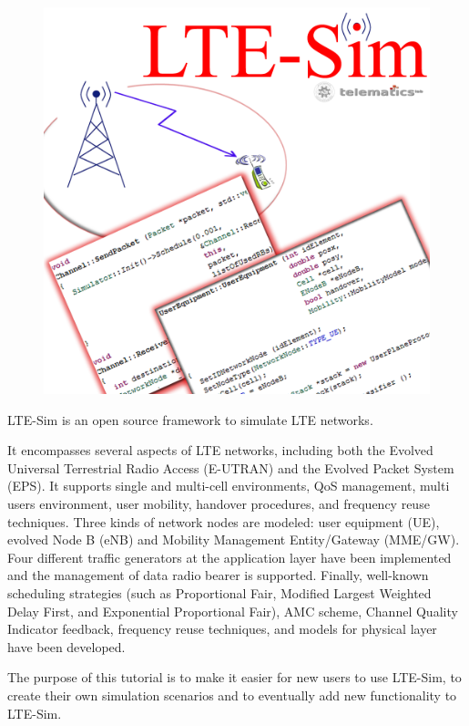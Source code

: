 \documentclass[11pt]{article}
\begin{document}
         


\begin{figure}[htp]
\centering
\includegraphics{lte-sim-web.png}
\end{figure}




LTE-Sim is an open source framework to simulate LTE networks.

It encompasses several aspects of LTE networks, including both the Evolved Universal Terrestrial Radio Access (E-UTRAN) and the Evolved Packet System (EPS). It supports single and multi-cell environments, QoS management, multi users environment, user mobility, handover procedures, and frequency reuse techniques. Three kinds of network nodes are modeled: user equipment (UE), evolved Node B (eNB) and Mobility Management Entity/Gateway (MME/GW). Four different traffic generators at the application layer have been implemented and the management of data radio bearer is supported. Finally, well-known scheduling strategies (such as Proportional Fair, Modified Largest Weighted Delay First, and Exponential Proportional Fair), AMC scheme, Channel Quality Indicator feedback, frequency reuse techniques, and models for physical layer have been developed.

The purpose of this tutorial is to make it easier for new users to use LTE-Sim, to create their own simulation scenarios and to eventually add new functionality to LTE-Sim.
\end{document}
